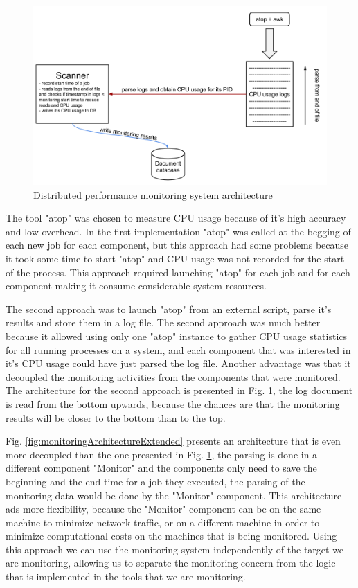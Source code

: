 \begin{figure}[t]
\centering
\includegraphics[width=\linewidth]{./img/MonitoringCPUMechanism.png}
\caption{Distributed performance monitoring system architecture}
\label{fig:monitoringArchitecture}
\end{figure} 
 
The tool "atop" was chosen to measure CPU usage because of it's high accuracy and low overhead. In the first implementation "atop" was called at the begging of each new job for each component, but this approach had some problems because it took some time to start "atop" and CPU usage was not recorded for the start of the process. This approach  required launching "atop" for each job and for each component making it consume considerable system resources. 

The second approach was to launch "atop" from an external script, parse it's results and store them in a log file. The second approach was much better because it allowed using only one "atop" instance to gather CPU usage statistics for all running processes on a system, and each component that was interested in it's CPU usage could have just parsed the log file. Another advantage was that it decoupled the monitoring activities from the components that were monitored. The architecture for the second approach is presented in Fig. \ref{fig:monitoringArchitecture}, the log document is read from the bottom upwards, because the chances are that the monitoring results will be closer to the bottom than to the top.

Fig. \ref{fig:monitoringArchitectureExtended}  presents an architecture that is even more decoupled than the one presented in Fig. \ref{fig:monitoringArchitecture}, the parsing is done in a different component "Monitor" and the components only need to save the beginning and the end time for a job they executed, the parsing of the monitoring data would be done by the "Monitor" component. This architecture ads more flexibility, because the "Monitor" component can be on the same machine to minimize network traffic,  or on a different machine in order to minimize computational costs on the machines that is being monitored. Using this approach we can use the monitoring system independently of the target we are monitoring, allowing us to separate the monitoring concern from the logic that is implemented in the tools that we are monitoring.


